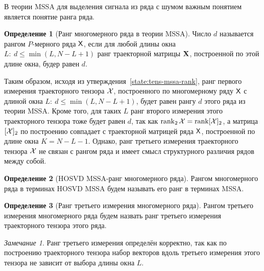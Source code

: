 \documentclass[specialist,
    substylefile = spbu_report.rtx,
    subf,href,colorlinks=true, 12pt]{disser}
\theoremstyle{plain}
\theoremstyle{definition}
\newtheorem{definition}{Определение}[section]
\theoremstyle{remark}
\newtheorem*{remark}{Замечание}
\begin{document}
    В теории MSSA для выделения сигнала из ряда с шумом важным понятием является понятие ранга ряда.
    \begin{definition}[Ранг многомерного ряда в теории MSSA]
        Число $d$ называется рангом $P$-мерного ряда $\mathsf{X}$, если для любой длины окна
        $L:\: d \leqslant\min(L, N-L+1)$ ранг траекторной матрицы $\mathbf{X}$, построенной по этой длине окна,
        будер равен $d$.
    \end{definition}

    Таким образом, исходя из утверждения~\ref{state:tens-mssa-rank}, ранг первого измерения траекторного тензора
    $\mathcal{X}$, построенного по многомерному ряду $\mathsf{X}$ с длиной окна $L:\: {d \leqslant\min(L, N-L+1)}$,
    будет равен рангу $d$ этого ряда из теории MSSA.
    Кроме того, для таких $L$ ранг второго измерения этого траекторного тензора
    тоже будет равен $d$, так как $\operatorname{rank}_2 \mathcal{X} = \operatorname{rank}[\mathcal{X}]_2$,
    а матрица $[\mathcal{X}]_2$ по построению совпадает с траекторной матрицей ряда $\mathsf{X}$, построенной по длине
    окна $K = N - L - 1$.
    Однако, ранг третьего измерения траекторного тензора $\mathcal{X}$ не связан с рангом ряда и имеет смысл
    структурного различия рядов между собой.

    \begin{definition}[HOSVD MSSA-ранг многомерного ряда]
        \label{def:hosvd-mssa-rank}
        Рангом многомерного ряда в терминах HOSVD MSSA будем называть его ранг в терминах MSSA.
    \end{definition}

    \begin{definition}[Ранг третьего измерения многомерного ряда]
        Рангом третьего измерения многомерного ряда будем назвать ранг третьего измерения
        траекторного тензора этого ряда.
    \end{definition}

    \begin{remark}
        Ранг третьего измерения определён корректно, так как по построению траекторного тензора
        набор векторов вдоль третьего измерения этого тензора не зависит от выбора длины окна $L$.
    \end{remark}
\end{document}
